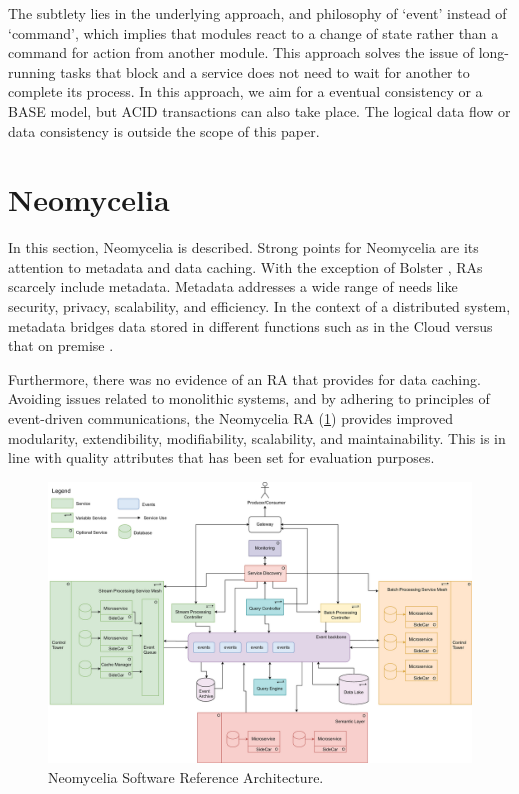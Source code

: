 \documentclass[10pt, conference]{IEEEtran}
\begin{document}
The subtlety lies in the underlying approach, and philosophy of ‘event’ instead of ‘command’, which implies that modules react to a change of state rather than a command for action from another module. This approach solves the issue of long-running tasks that block and a service does not need to wait for another to complete its process. In this approach, we aim for a eventual consistency or a BASE model, but ACID transactions can also take place. The logical data flow or data consistency is outside the scope of this paper.


\section{Neomycelia}

In this section, Neomycelia is described. Strong points for Neomycelia are its attention to metadata and data caching. With the exception of Bolster \cite{Nadal}, RAs scarcely include metadata. Metadata addresses a wide range of needs like security, privacy, scalability, and efficiency. In the context of  a distributed system, metadata bridges data stored in different functions such as in the Cloud versus that on premise \cite{Eichler}.

Furthermore, there was no evidence of an RA that provides for data caching. Avoiding issues related to monolithic systems, and by adhering to principles of event-driven communications, the Neomycelia RA (\ref{NeomyceliaFig}) provides improved modularity, extendibility, modifiability, scalability, and maintainability. This is in line with quality attributes that has been set for evaluation purposes.

\begin{figure}[!ht]
    \centering
    \includegraphics[width=\textwidth]{Neomycelia.eps}
    \caption{Neomycelia Software Reference Architecture.} \label{NeomyceliaFig}
\end{figure}
\end{document}
